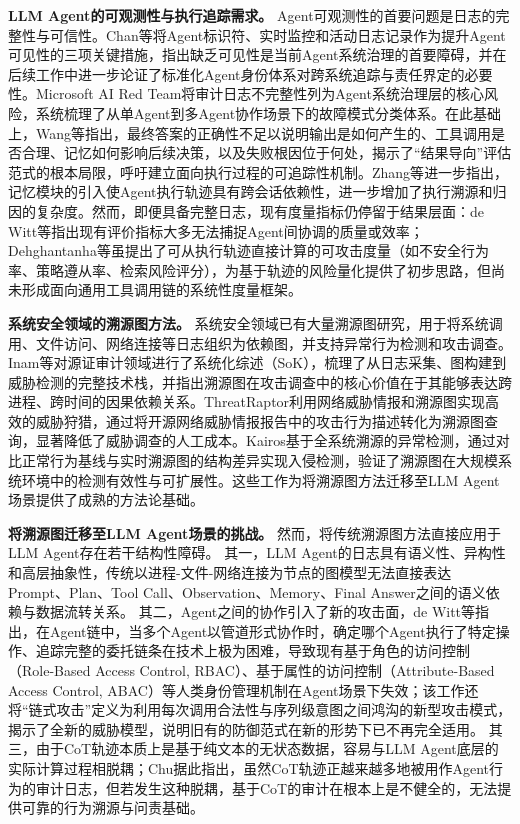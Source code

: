 \textbf{LLM Agent的可观测性与执行追踪需求。}
Agent可观测性的首要问题是日志的完整性与可信性。Chan等\cite{chan2024visibility}将Agent标识符、实时监控和活动日志记录作为提升Agent可见性的三项关键措施，指出缺乏可见性是当前Agent系统治理的首要障碍，并在后续工作\cite{chan2024ids}中进一步论证了标准化Agent身份体系对跨系统追踪与责任界定的必要性。Microsoft AI Red Team\cite{microsoft2025taxonomy}将审计日志不完整性列为Agent系统治理层的核心风险，系统梳理了从单Agent到多Agent协作场景下的故障模式分类体系。在此基础上，Wang等\cite{wang2026fromagenttraces}指出，最终答案的正确性不足以说明输出是如何产生的、工具调用是否合理、记忆如何影响后续决策，以及失败根因位于何处，揭示了“结果导向”评估范式的根本局限，呼吁建立面向执行过程的可追踪性机制。Zhang等\cite{zhang2025survey}进一步指出，记忆模块的引入使Agent执行轨迹具有跨会话依赖性，进一步增加了执行溯源和归因的复杂度。然而，即便具备完整日志，现有度量指标仍停留于结果层面：de Witt等\cite{dewitt2026openchallenges}指出现有评价指标大多无法捕捉Agent间协调的质量或效率；Dehghantanha等\cite{dehghantanha2026sokattacksurfaceagentic}虽提出了可从执行轨迹直接计算的可攻击度量（如不安全行为率、策略遵从率、检索风险评分），为基于轨迹的风险量化提供了初步思路，但尚未形成面向通用工具调用链的系统性度量框架。

\textbf{系统安全领域的溯源图方法。}
系统安全领域已有大量溯源图研究，用于将系统调用、文件访问、网络连接等日志组织为依赖图，并支持异常行为检测和攻击调查。Inam等\cite{inam2023sok}对源证审计领域进行了系统化综述（SoK），梳理了从日志采集、图构建到威胁检测的完整技术栈，并指出溯源图在攻击调查中的核心价值在于其能够表达跨进程、跨时间的因果依赖关系。ThreatRaptor\cite{gao2021threatraptor}利用网络威胁情报和溯源图实现高效的威胁狩猎，通过将开源网络威胁情报报告中的攻击行为描述转化为溯源图查询，显著降低了威胁调查的人工成本。Kairos\cite{cheng2024kairos}基于全系统溯源的异常检测，通过对比正常行为基线与实时溯源图的结构差异实现入侵检测，验证了溯源图在大规模系统环境中的检测有效性与可扩展性。这些工作为将溯源图方法迁移至LLM Agent场景提供了成熟的方法论基础。

\textbf{将溯源图迁移至LLM Agent场景的挑战。}
然而，将传统溯源图方法直接应用于LLM Agent存在若干结构性障碍。
其一，LLM Agent的日志具有语义性、异构性和高层抽象性，传统以进程-文件-网络连接为节点的图模型无法直接表达Prompt、Plan、Tool Call、Observation、Memory、Final Answer之间的语义依赖与数据流转关系。
其二，Agent之间的协作引入了新的攻击面，de Witt等\cite{dewitt2026openchallenges}指出，在Agent链中，当多个Agent以管道形式协作时，确定哪个Agent执行了特定操作、追踪完整的委托链条在技术上极为困难，导致现有基于角色的访问控制（Role-Based Access Control, RBAC）、基于属性的访问控制（Attribute-Based Access Control, ABAC）等人类身份管理机制在Agent场景下失效；该工作还将“链式攻击”定义为利用每次调用合法性与序列级意图之间鸿沟的新型攻击模式，揭示了全新的威胁模型，说明旧有的防御范式在新的形势下已不再完全适用。
其三，由于CoT轨迹本质上是基于纯文本的无状态数据，容易与LLM Agent底层的实际计算过程相脱耦；Chu\cite{chu2026systematic}据此指出，虽然CoT轨迹正越来越多地被用作Agent行为的审计日志，但若发生这种脱耦，基于CoT的审计在根本上是不健全的，无法提供可靠的行为溯源与问责基础。

